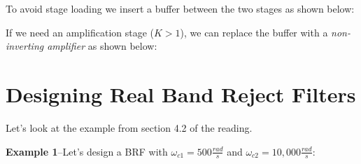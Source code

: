 \documentclass{handout}
\begin{document}
\newpage
\clearpage
\pagebreak

To avoid stage loading we insert a buffer between the two stages as shown below:


If we need an amplification stage ($K>1$), we can replace the buffer with a {\em non-inverting amplifier} as shown below:


\newpage
\clearpage
\pagebreak

\section{Designing Real Band Reject Filters}
Let's look at the example from section 4.2 of the reading.

\textbf{Example 1}--Let's design a BRF with $\omega_{c1}=500\frac{rad}{s}$ and $\omega_{c2}=10,000\frac{rad}{s}$:
\end{document}
